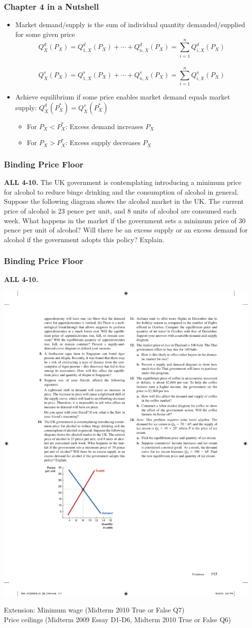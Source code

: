 \documentclass[12pt, xcolor=dvipsnames]{beamer}
\begin{document}
\begin{frame}
\frametitle{\bf Chapter 4 in a Nutshell}
\begin{itemize}
\item Market demand/supply is the sum of individual quantity demanded/supplied for some given price
\[Q_X^d(P_X)=Q_{1,X}^d(P_X)+\cdots+Q_{n,X}^d(P_X)=\sum^n_{i=1}Q_{i,X}^d(P_X)\]\\[-5mm]
\[Q_X^s(P_X)=Q_{1,X}^s(P_X)+\cdots+Q_{n,X}^s(P_X)=\sum^n_{i=1}Q_{i,X}^s(P_X)\]
\item Achieve equilibrium if some price enables market demand equals market supply: $Q_X^d(P^*_X)=Q_X^s(P^*_X)$
\begin{itemize}
\item For $P_X<P^*_X$: Excess demand increases $P_X$
\item For $P_X>P^*_X$: Excess supply decreases $P_X$
\end{itemize}
\end{itemize}
\end{frame}


\begin{frame}
\frametitle{\bf Binding Price Floor}
\small \textsf{\bfseries ALL 4-10.} The UK government is contemplating introducing a minimum price for alcohol to reduce binge drinking and the consumption of alcohol in general. Suppose the following diagram shows the alcohol market in the UK. The current price of alcohol is 23 pence per unit, and 8 units of alcohol are consumed each week. What happens in the market if the government sets a minimum price of 30 pence per unit of alcohol? Will there be an excess supply or an excess demand for alcohol if the government adopts this policy? Explain.\end{frame}


\begin{frame}
\frametitle{\bf Binding Price Floor}
\small \textsf{\bfseries ALL 4-10.}
\begin{center}
\includegraphics[width=.5\linewidth]{figures/4-10.pdf}
\end{center}
\vspace{-7mm}
Extension: Minimum wage (Midterm 2010 True or False Q7)\\
Price ceilings (Midterm 2009 Essay D1-D6, Midterm 2010 True or False Q6)
\end{frame}
\end{document}
